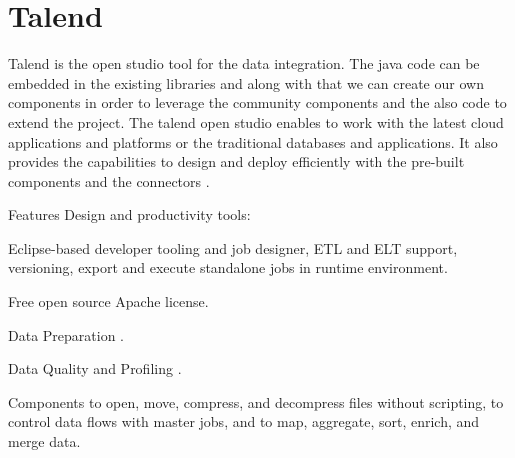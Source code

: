 \section{Talend}
Talend is the open studio tool for the data integration. The java code can 
be embedded in the existing libraries and along with that we can create our 
own components in order to leverage the community components and the also code 
to extend the project. The talend open studio enables to work with the 
latest cloud applications and platforms or the traditional databases and 
applications. It also provides the capabilities to design and deploy 
efficiently with the pre-built components 
and the connectors \cite{hid-sp18-412-talend_open_studio}.

Features Design and productivity tools: 

Eclipse-based developer tooling and 
job designer, ETL and ELT support, versioning, export and 
execute standalone jobs in runtime environment.

Free open source Apache license.

Data Preparation \cite{hid-sp18-412-data_preparation}. 

Data Quality and Profiling \cite{hid-sp18-412-data_quality}.

Components to open, move, compress, and decompress files without scripting, 
to control data flows with master jobs, and to map, aggregate, sort, 
enrich, and merge data.

